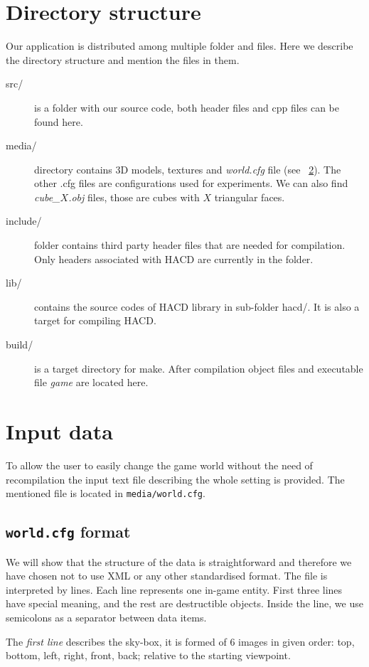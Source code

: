 \section{Directory structure}
Our application is distributed among multiple folder and files. Here we describe the directory structure and mention the files in them.
\begin{description}
\item[src/] is a folder with our source code, both header files and cpp files can be found here.
\item[media/] directory contains 3D models, textures and \emph{world.cfg}  file (see ~\cref{sec:data}). The other .cfg files are configurations used for experiments. We can also find \emph{cube\_$X$.obj} files, those are cubes with $X$ triangular faces.
\item[include/] folder contains third party header files that are needed for compilation. Only headers associated with HACD are currently in the folder.
\item[lib/] contains the source codes of HACD library in sub-folder hacd/. It is also a target for compiling HACD.
\item[build/] is a target directory for make. After compilation object files and executable file \emph{game} are located here. 
\end{description}

\section{Input data}
\label{sec:data}
To allow the user to easily change the game world without the need of recompilation the input text file describing the whole setting is provided. The mentioned file is located in {\tt media/world.cfg}. 

\subsection*{{\tt world.cfg} format}
We will show that the structure of the data is straightforward and therefore we have chosen not to use XML or any other standardised format. The file is interpreted by lines. Each line represents one in-game entity. First three lines have special meaning, and the rest are destructible objects. Inside the line, we use semicolons as a separator between data items.

The \emph{first line} describes the sky-box, it is formed of 6 images in given order: top, bottom, left, right, front, back; relative to the starting viewpoint. 

